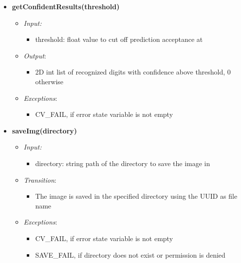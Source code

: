 \documentclass[11pt]{article}
\begin{document}
\begin{itemize}
			
		\item \textbf{getConfidentResults(threshold)}
		\begin{itemize}
		    \item[] \textit{Input: } 		    
		    \begin{itemize}
		        \item threshold: float value to cut off prediction acceptance at
		    \end{itemize}
		    \item[] \textit{Output}: 
		    \begin{itemize}
		        \item 2D int list of recognized digits with confidence above threshold, 0 otherwise 
		    \end{itemize}
		    
		    \item[] \textit{Exceptions}:
		    \begin{itemize}
		        \item CV\_FAIL, if error state variable is not empty
		    \end{itemize}
		\end{itemize}
		
		\item \textbf{saveImg(directory)}
		\begin{itemize}
		    \item[] \textit{Input: } 		    
		    \begin{itemize}
		        \item directory: string path of the directory to save the image in
		    \end{itemize}
		    \item[] \textit{Transition}: 
		    \begin{itemize}
		        \item The image is saved in the specified directory using the UUID as file name
		    \end{itemize}
		    
		    \item[] \textit{Exceptions}:
		    \begin{itemize}
		        \item CV\_FAIL, if error state variable is not empty
		        \item SAVE\_FAIL, if directory does not exist or permission is denied
		    \end{itemize}
		\end{itemize}
		

\end{itemize}
\end{document}

